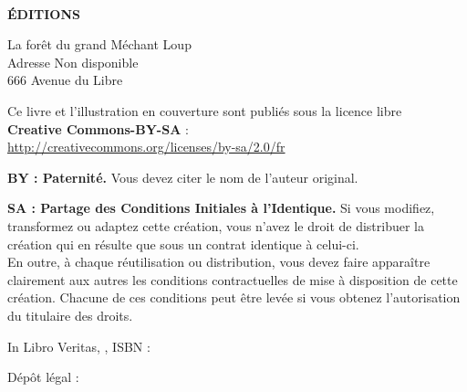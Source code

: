 \thispagestyle{empty}
\null{}
{\centering
	{\bfseries
		{\fontsize{28}{44}\selectfont\MakeTitre{}}\\
		{\fontsize{14}{44}\selectfont\version{}}\par
		{\fontsize{20.74}{22}\selectfont\soustitre}\par
		{\fontsize{12}{36}\selectfont\MakeAuteur}\par
		\begin{figure}[h]%
			\begin{center}%
				\leavevmode%
				\hspace{1cm}%
			\end{center}%
		\end{figure}%
	}\newpage\thispagestyle{empty}
	{\bfseries\fontsize{14}{16}\selectfont{}ÉDITIONS}\par

	{\fontsize{14}{16}\selectfont{}La forêt du grand Méchant Loup\\
														Adresse Non disponible\\
														666 Avenue du Libre }\par
	{\fontsize{12}{14}\selectfont{}Ce livre et l'illustration en couverture sont publiés sous la licence libre\\\textbf{Creative Commons-BY-SA} :\\\url{http://creativecommons.org/licenses/by-sa/2.0/fr}\par}
}
{\setlength{\parskip}{1.5\baselineskip}
	\textbf{BY : Paternité.} Vous devez citer le nom de l'auteur original.\par
	\textbf{SA : Partage des Conditions Initiales à l'Identique.} Si vous modifiez, transformez ou adaptez cette création, vous n'avez le droit de distribuer la création qui en résulte que sous un contrat identique à celui-ci.\\
	En outre, à chaque réutilisation ou distribution, vous devez faire apparaître clairement aux autres les conditions contractuelles de mise à disposition de cette création. Chacune de ces conditions peut être levée si vous obtenez l'autorisation du titulaire des droits.\par
}
{\centering\setlength{\parskip}{2\baselineskip}
	In Libro Veritas, \anneedepot{}, ISBN : \isbn\par
	Dépôt légal : \datedepot\par
}
